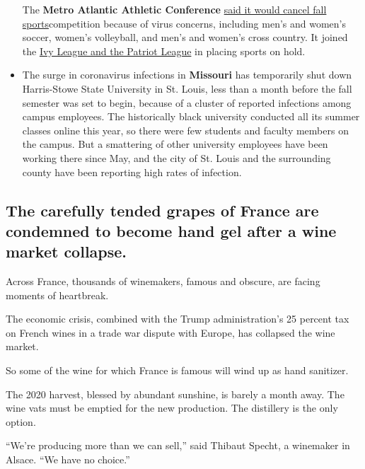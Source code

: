 \begin{itemize}
  The \textbf{Metro Atlantic Athletic Conference}
  \href{https://maacsports.com/news/2020/7/27/general-maac-statement-of-fall-sports-competition.aspx}{said
  it would cancel fall sports}competition because of virus concerns,
  including men's and women's soccer, women's volleyball, and men's and
  women's cross country. It joined the
  \href{https://www.nytimes.com/2020/07/08/sports/ncaafootball/ivy-league-fall-sports-football-coronavirus.html}{Ivy
  League and the Patriot League} in placing sports on hold.
\item
  The surge in coronavirus infections in \textbf{Missouri} has
  temporarily shut down Harris-Stowe State University in St. Louis, less
  than a month before the fall semester was set to begin, because of a
  cluster of reported infections among campus employees. The
  historically black university conducted all its summer classes online
  this year, so there were few students and faculty members on the
  campus. But a smattering of other university employees have been
  working there since May, and the city of St. Louis and the surrounding
  county have been reporting high rates of infection.
\end{itemize}

\hypertarget{the-carefully-tended-grapes-of-france-are-condemned-to-become-hand-gel-after-a-wine-market-collapse}{%
\subsection{The carefully tended grapes of France are condemned to
become hand gel after a wine market
collapse.}\label{the-carefully-tended-grapes-of-france-are-condemned-to-become-hand-gel-after-a-wine-market-collapse}}

Across France, thousands of winemakers, famous and obscure, are facing
moments of heartbreak.

The economic crisis, combined with the Trump administration's 25 percent
tax on French wines in a trade war dispute with Europe, has collapsed
the wine market.

So some of the wine for which France is famous will wind up as hand
sanitizer.

The 2020 harvest, blessed by abundant sunshine, is barely a month away.
The wine vats must be emptied for the new production. The distillery is
the only option.

``We're producing more than we can sell,'' said Thibaut Specht, a
winemaker in Alsace. ``We have no choice.''

